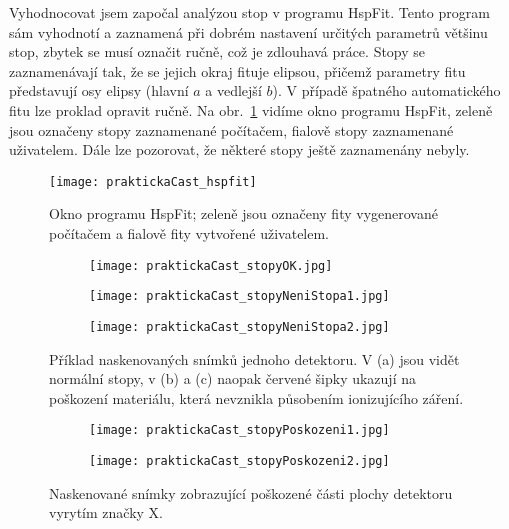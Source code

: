Vyhodnocovat jsem započal analýzou stop v programu HspFit. Tento program sám vyhodnotí a zaznamená při dobrém nastavení určitých parametrů většinu stop, zbytek se musí označit ručně, což je zdlouhavá práce. Stopy se zaznamenávají tak, že se jejich okraj fituje elipsou, přičemž parametry fitu představují osy elipsy (hlavní $a$ a vedlejší $b$). V případě špatného automatického fitu lze proklad opravit ručně. Na obr.~\ref{fig:praktickaCast_hspfit} vidíme okno programu HspFit, zeleně jsou označeny stopy zaznamenané počítačem, fialově stopy zaznamenané uživatelem. Dále lze pozorovat, že některé stopy ještě zaznamenány nebyly. 
\begin{figure}[ht]
  \centering
  \texttt{[image: praktickaCast\_hspfit]}
  \caption{Okno programu HspFit; zeleně jsou označeny fity vygenerované počítačem a fialově fity vytvořené uživatelem.~\cite{dosis_HSP1000}}
  \label{fig:praktickaCast_hspfit}
\end{figure}
\begin{figure}[p]
  \centering
  \begin{subfigure}{0.7\textwidth}
	\texttt{[image: praktickaCast\_stopyOK.jpg]}
	\caption{}
  \end{subfigure}
  \begin{subfigure}{0.7\textwidth}
	\texttt{[image: praktickaCast\_stopyNeniStopa1.jpg]}
	\caption{}
  \end{subfigure}
  \begin{subfigure}{0.7\textwidth}
	\texttt{[image: praktickaCast\_stopyNeniStopa2.jpg]}
	\caption{}
  \end{subfigure}
  \caption{Příklad naskenovaných snímků jednoho detektoru. V (a) jsou vidět normální stopy, v (b) a (c) naopak červené šipky ukazují na poškození materiálu, která nevznikla působením ionizujícího záření.}
  \label{fig:praktickaCast_stopy}
\end{figure}
\begin{figure}[ht]
  \centering
  \begin{subfigure}{0.7\textwidth}
	\texttt{[image: praktickaCast\_stopyPoskozeni1.jpg]}
	\caption{}
  \end{subfigure}
  \begin{subfigure}{0.7\textwidth}
	\texttt{[image: praktickaCast\_stopyPoskozeni2.jpg]}
	\caption{}
  \end{subfigure}
  \caption{Naskenované snímky zobrazující poškozené části plochy detektoru vyrytím značky X.}
  \label{fig:praktickaCast_stopyPoskozeni}
\end{figure}

